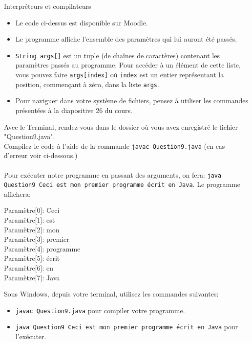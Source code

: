 \begin{section}{Interpréteurs et compilateurs}
\begin{Exercice}[10 minutes]
        \begin{conseil}
            \begin{itemize}
                \item Le code ci-dessus est disponible sur Moodle.
                \item Le programme affiche l'ensemble des paramètres qui lui auront été passés.
                \item \lstinline{String args[]} est un tuple (de chaînes de caractères) contenant les paramètres passés au programme. Pour accéder à un élément de cette liste, vous pouvez faire \lstinline{args[index]} où \lstinline{index} est un entier représentant la position, commençant à zéro, dans la liste \lstinline{args}.
                \item Pour naviguer dans votre système de fichiers, pensez à utiliser les commandes présentées à la diapositive 26 du cours.
            \end{itemize}
        \end{conseil}
        \begin{solution}
            Avec le Terminal, rendez-vous dans le dossier où vous avez enregistré le fichier "Question9.java".\\
            Compilez le code à l'aide de la commande \lstinline{javac Question9.java} (en cas d'erreur voir ci-dessous.)\\\\
            Pour exécuter notre programme en passant des arguments, on fera: \lstinline{java Question9 Ceci est mon premier programme écrit en Java}. Le programme affichera:\\
            
            \parbox{\textwidth}{
                \ttfamily
                Paramètre[0]: Ceci\\
                Paramètre[1]: est\\
                Paramètre[2]: mon\\
                Paramètre[3]: premier\\
                Paramètre[4]: programme\\
                Paramètre[5]: écrit\\
                Paramètre[6]: en\\
                Paramètre[7]: Java\\
            }
            Sous Windows, depuis votre terminal, utilisez les commandes suivantes:
            \begin{itemize}
                \item \lstinline{javac Question9.java} pour compiler votre programme.
                \item \lstinline{java Question9 Ceci est mon premier programme écrit en Java} pour l'exécuter.\\
            \end{itemize}


\end{solution}
\end{Exercice}
\end{section}
